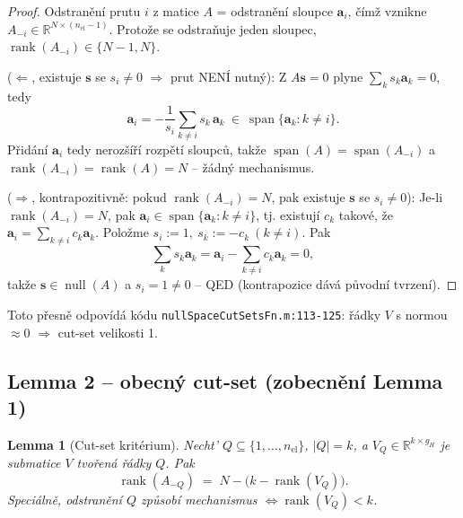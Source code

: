 \documentclass[11pt,a4paper]{article}
\newtheorem{lemma}{Lemma}
\newcommand{\R}{\mathbb{R}}
\newcommand{\code}[1]{\texttt{#1}}
\newcommand{\rank}{\operatorname{rank}}
\begin{document}
\begin{proof}
Odstranění prutu $i$ z matice $A$ = odstranění sloupce $\mathbf a_i$, čímž vznikne
$A_{-i}\in\R^{N\times(n_{\mathrm{el}}-1)}$. Protože se odstraňuje jeden sloupec, $\rank(A_{-i})\in\{N-1,N\}$.

\smallskip
\noindent($\Leftarrow$, existuje $\mathbf s$ se $s_i\neq0$ $\Rightarrow$ prut NENÍ nutný): Z
$A\mathbf s=0$ plyne $\sum_k s_k\mathbf a_k = 0$, tedy
\[
  \mathbf a_i = -\frac1{s_i}\sum_{k\neq i} s_k\, \mathbf a_k \ \in\ \operatorname{span}\{\mathbf a_k:k\neq i\}.
\]
Přidání $\mathbf a_i$ tedy nerozšíří rozpětí sloupců, takže $\operatorname{span}(A)=\operatorname{span}
(A_{-i})$ a $\rank(A_{-i})=\rank(A)=N$ -- žádný mechanismus.

\smallskip
\noindent($\Rightarrow$, kontrapozitivně: pokud $\rank(A_{-i})=N$, pak existuje $\mathbf s$ se
$s_i\neq0$): Je-li $\rank(A_{-i})=N$, pak $\mathbf a_i\in\operatorname{span}\{\mathbf a_k:k\neq i\}$,
tj. existují $c_k$ takové, že $\mathbf a_i = \sum_{k\neq i} c_k \mathbf a_k$. Položme
$s_i:=1,\ s_k:=-c_k\ (k\neq i)$. Pak
\[
  \sum_k s_k \mathbf a_k = \mathbf a_i - \sum_{k\neq i} c_k\mathbf a_k = 0,
\]
takže $\mathbf s\in\operatorname{null}(A)$ a $s_i=1\neq0$ -- QED (kontrapozice dává původní tvrzení).
\end{proof}

Toto přesně odpovídá kódu \code{nullSpaceCutSetsFn.m:113-125}: řádky $V$ s normou $\approx0$
$\Rightarrow$ cut-set velikosti 1.

\subsection{Lemma 2 -- obecný cut-set (zobecnění Lemma 1)}

\begin{lemma}[Cut-set kritérium]
Necht' $Q\subseteq\{1,\dots,n_{\mathrm{el}}\}$, $|Q|=k$, a $V_Q\in\R^{k\times g_H}$ je submatice $V$
tvořená řádky $Q$. Pak
\[
  \rank(A_{-Q}) \;=\; N - \big(k - \rank(V_Q)\big).
\]
Speciálně, odstranění $Q$ způsobí mechanismus $\iff \rank(V_Q) < k$.
\end{lemma}
\end{document}
